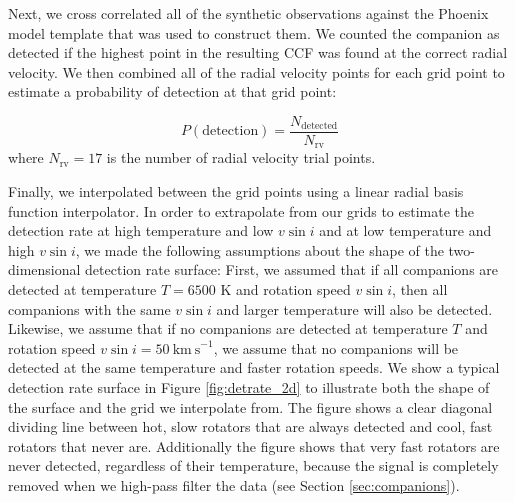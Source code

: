 \documentclass{emulateapj}
\begin{document}
Next, we cross correlated all of the synthetic observations against the Phoenix model template that was used to construct them. We counted the companion as detected if the highest point in the resulting CCF was found at the correct radial velocity. We then combined all of the radial velocity points for each grid point to estimate a probability of detection at that grid point:

\begin{equation}
P(\mathrm{detection}) = \frac{N_\mathrm{detected}}{N_\mathrm{rv}}
\end{equation}
where $N_\mathrm{rv} = 17$ is the number of radial velocity trial points. 

Finally, we interpolated between the grid points using a linear radial basis function interpolator. In order to extrapolate from our grids to estimate the detection rate at high temperature and low $v\sin{i}$ and at low temperature and high $v\sin{i}$, we made the following assumptions about the shape of the two-dimensional detection rate surface: First, we assumed that if all companions are detected at temperature $T=6500$ K and rotation speed $v\sin{i}$, then all companions with the same $v\sin{i}$ and larger temperature will also be detected. Likewise, we assume that if no companions are detected at temperature $T$ and rotation speed $v\sin{i} = 50\ \mathrm{km\ s}^{-1}$, we assume that no companions will be detected at the same temperature and faster rotation speeds. We show a typical detection rate surface in Figure \ref{fig:detrate_2d} to illustrate both the shape of the surface and the grid we interpolate from. The figure shows a clear diagonal dividing line between hot, slow rotators that are always detected and cool, fast rotators that never are. Additionally the figure shows that very fast rotators are never detected, regardless of their temperature, because the signal is completely removed when we high-pass filter the data (see Section \ref{sec:companions}).
\end{document}
